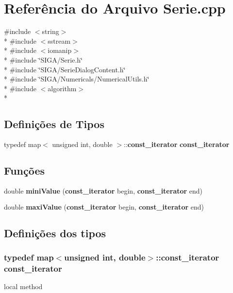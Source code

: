 \section{Referência do Arquivo Serie.\+cpp}
\label{_serie_8cpp}
{\ttfamily \#include $<$string$>$}\\*
{\ttfamily \#include $<$sstream$>$}\\*
{\ttfamily \#include $<$iomanip$>$}\\*
{\ttfamily \#include \char`\"{}S\+I\+G\+A/\+Serie.\+h\char`\"{}}\\*
{\ttfamily \#include \char`\"{}S\+I\+G\+A/\+Serie\+Dialog\+Content.\+h\char`\"{}}\\*
{\ttfamily \#include \char`\"{}S\+I\+G\+A/\+Numericals/\+Numerical\+Utils.\+h\char`\"{}}\\*
{\ttfamily \#include $<$algorithm$>$}\\*
\subsection*{Definições de Tipos}
\begin{DoxyCompactItemize}
\item 
typedef map$<$ unsigned int, double $>$\+::{\bf const\+\_\+iterator} {\bf const\+\_\+iterator}
\end{DoxyCompactItemize}
\subsection*{Funções}
\begin{DoxyCompactItemize}
\item 
double {\bf mini\+Value} ({\bf const\+\_\+iterator} begin, {\bf const\+\_\+iterator} end)
\item 
double {\bf maxi\+Value} ({\bf const\+\_\+iterator} begin, {\bf const\+\_\+iterator} end)
\end{DoxyCompactItemize}


\subsection{Definições dos tipos}
\subsubsection[{const\+\_\+iterator}]{\setlength{\rightskip}{0pt plus 5cm}typedef map$<$unsigned int, double$>$\+::{\bf const\+\_\+iterator} {\bf const\+\_\+iterator}}\label{_serie_8cpp_a87ab6237a14d94e1695875b9d7f110b5}
local method 

